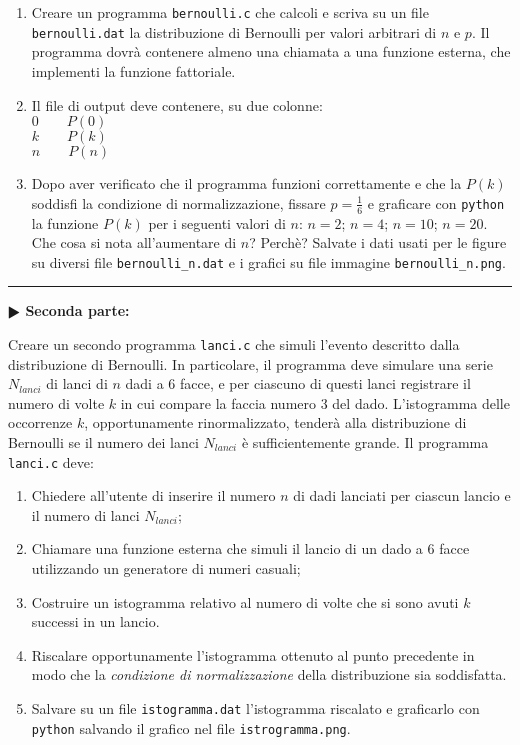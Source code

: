 \documentclass[11pt]{article}
\begin{document}
\begin{enumerate}
\item Creare un programma \texttt{bernoulli.c} che calcoli e scriva su un file \texttt{bernoulli.dat} la
distribuzione di Bernoulli per valori arbitrari di $n$ e $p$. Il programma dovr\`a contenere almeno
una chiamata a una funzione esterna, che implementi la funzione fattoriale.
\item Il file di output deve contenere, su due colonne:
\\
\texttt{$0 \quad \quad P(0)$}
\\
\texttt{$k \quad \quad P(k)$}
\\
\texttt{$n \quad \quad P(n)$}

\item Dopo aver verificato che il programma funzioni correttamente e che la $P(k)$ soddisfi la condizione di
  normalizzazione, fissare $p=\frac{1}{6}$ e graficare con \texttt{python} la funzione $P(k)$ per i seguenti valori di $n$:
$n=2$; $n=4$; $n=10$; $n=20$.
Che cosa si nota all'aumentare di $n$? Perch\`e?
Salvate i dati usati per le figure su diversi file \texttt{bernoulli\_n.dat} e i grafici su file immagine
\texttt{bernoulli\_n.png}.
\end{enumerate}

\hrule
\vspace{2mm}
\textbf{$\RHD$ Seconda parte:}
\vspace{2mm}

Creare un secondo programma \texttt{lanci.c} che simuli l'evento descritto dalla distribuzione di Bernoulli.
In particolare, il programma deve simulare una serie $N_{lanci}$ di lanci di $n$ dadi a 6 facce, e per
ciascuno di questi lanci registrare il numero di volte $k$ in cui compare la faccia numero 3 del dado.
L'istogramma delle occorrenze $k$, opportunamente rinormalizzato, tender\`a alla distribuzione di 
Bernoulli se il numero dei lanci $N_{lanci}$ \`e sufficientemente grande.
Il programma \texttt{lanci.c} deve:

\begin{enumerate}
\item Chiedere all'utente di inserire il numero $n$ di dadi lanciati per ciascun lancio e il numero di lanci $N_{lanci}$;
\item Chiamare una funzione esterna che simuli il lancio di un dado a 6 facce utilizzando un generatore di numeri casuali;
\item Costruire un istogramma relativo al numero di volte che si sono avuti $k$ successi in un lancio.
\item Riscalare opportunamente l'istogramma ottenuto al punto precedente in modo che la {\em condizione di normalizzazione\/} della distribuzione sia soddisfatta.
\item Salvare su un file \texttt{istogramma.dat} l'istogramma riscalato e graficarlo con \texttt{python} salvando il grafico
  nel file \texttt{istrogramma.png}. 
\end{enumerate}
\end{document}
